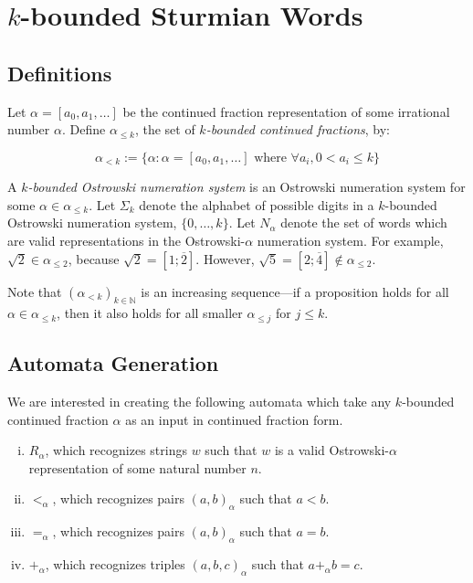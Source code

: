 \section{$k$-bounded Sturmian Words}\label{sec:automata}

\subsection{Definitions}

Let $\alpha = [a_0, a_1, \ldots]$ be the continued fraction representation of some irrational number $\alpha$.
Define $\alpha_{\leq k}$, the set of \textit{$k$-bounded continued fractions}, by:

\begin{equation*}
    \alpha_{<k} := \{ \alpha : \alpha = [ a_0, a_1, \ldots] \text{ where } \forall a_i, 0 < a_i \leq k\}
\end{equation*}

A \textit{$k$-bounded Ostrowski numeration system} is an Ostrowski numeration system for some $\alpha \in \alpha_{\leq k}$. 
Let $\Sigma_k$ denote the alphabet of possible digits in a $k$-bounded Ostrowski numeration system, $\{0,\ldots,k\}$.
Let $N_{\alpha}$ denote the set of words which are valid representations in the Ostrowski-$\alpha$ numeration system.
For example, $\sqrt{2} \in \alpha_{\leq 2}$, because $\sqrt{2} = [1; \overline{2}]$.
However, $\sqrt{5} = [2; \overline{4}] \not\in \alpha_{\leq 2}$.

Note that $\left( \alpha_{<k} \right)_{k \in \mathbb{N}}$ is an increasing sequence---if a proposition holds for all $\alpha \in \alpha_{\leq k}$, then it also holds for all smaller $\alpha_{\leq j}$ for $j \leq k$.

\subsection{Automata Generation}

We are interested in creating the following automata which take any $k$-bounded continued fraction $\alpha$ as an input in continued fraction form.

\begin{enumerate}[(i)]
    \item $R_{\alpha}$, which recognizes strings $w$ such that $w$ is a valid Ostrowski-$\alpha$ representation of some natural number $n$.
    \item $<_{\alpha}$, which recognizes pairs $(a,b)_{\alpha}$ such that $a < b$.
    \item $=_{\alpha}$, which recognizes pairs $(a,b)_{\alpha}$ such that $a = b$.
    \item $+_{\alpha}$, which recognizes triples $(a,b,c)_{\alpha}$ such that $a +_{\alpha} b = c$.
\end{enumerate}

